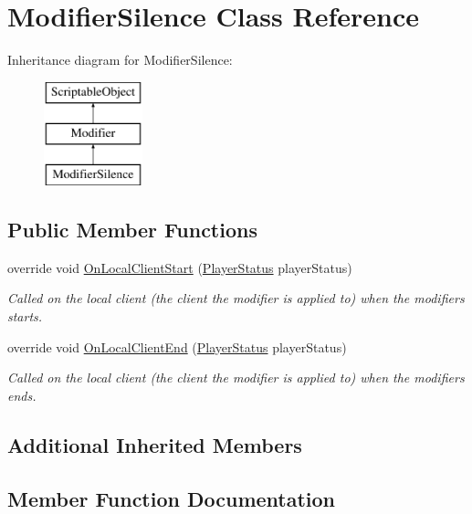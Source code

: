 \hypertarget{class_modifier_silence}{}\section{Modifier\+Silence Class Reference}
\label{class_modifier_silence}
Inheritance diagram for Modifier\+Silence\+:\begin{figure}[H]
\begin{center}
\leavevmode
\includegraphics[height=3.000000cm]{class_modifier_silence}
\end{center}
\end{figure}
\subsection*{Public Member Functions}
\begin{DoxyCompactItemize}
\item 
override void \hyperlink{class_modifier_silence_a46d7fc89d95ab9e45013d79949254288}{On\+Local\+Client\+Start} (\hyperlink{class_player_status}{Player\+Status} player\+Status)
\begin{DoxyCompactList}\small\item\em Called on the local client (the client the modifier is applied to) when the modifiers starts. \end{DoxyCompactList}\item 
override void \hyperlink{class_modifier_silence_a51051e6002b6eb984df8aa9c9c22ee7b}{On\+Local\+Client\+End} (\hyperlink{class_player_status}{Player\+Status} player\+Status)
\begin{DoxyCompactList}\small\item\em Called on the local client (the client the modifier is applied to) when the modifiers ends. \end{DoxyCompactList}\end{DoxyCompactItemize}
\subsection*{Additional Inherited Members}


\subsection{Member Function Documentation}
\hypertarget{class_modifier_silence_a51051e6002b6eb984df8aa9c9c22ee7b}{}\label{class_modifier_silence_a51051e6002b6eb984df8aa9c9c22ee7b} 
